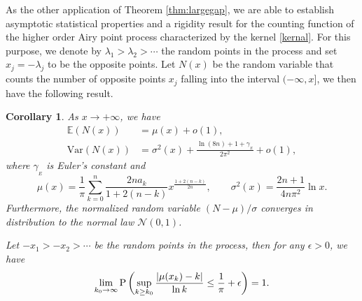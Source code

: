 \documentclass[11pt,a4paper]{article}
\newtheorem{corollary}[thm]{Corollary}
\numberwithin{equation}{section}
\def\sup {\mathop{\rm sup}\nolimits}
\begin{document}
As the other application of Theorem \ref{thm:largegap}, we are able to establish asymptotic statistical properties and a rigidity result for the counting function of the higher order Airy point process characterized by
the kernel \eqref{kernal}. For this purpose, we denote by $\lambda_1>\lambda_2>\cdots$ the random points in the process and set $x_j=-\lambda_j$ to be the opposite points. Let $N(x)$ be the random variable that counts the number of opposite points $x_j$ falling  into the interval $(-\infty,x]$, we then have the following result.
\begin{corollary}\label{thm3}
As $x\to+\infty$, we have
\begin{align}\label{expection}
\mathbb{E}(N(x))&=\mu(x)+o(1),\\
\mathrm{Var}(N(x))&=\sigma^2(x)+\frac{\ln(8n)+1+\gamma_{_E}}{2\pi^2}
+o(1),\label{variation}
\end{align}
where $\gamma_{_E}$ is Euler's constant and
\begin{equation}\label{eq:sigma}
\mu(x)=\frac{1}{\pi}\sum_{k=0}^{n}\frac{2na_k}{1+2(n-k)}x^{\frac{1+2(n-k)}{2n}},\qquad \sigma^2(x)=\frac{2n+1}{4n\pi^2}\ln{x}.
\end{equation}
Furthermore, the normalized random variable $(N-\mu)/\sigma$ converges in distribution to the normal law $\mathcal{N}(0,1)$.

Let $-x_1>-x_2>\cdots$ be the random points in the process, then for any $\epsilon>0$, we have
\begin{equation}\label{eq:upperB}
\lim_{k_0\to\infty}\mathrm{P} \left(\sup\limits_{k\geq k_0}\frac{|\mu(x_k)-k|}{ \ln k} \leq  \frac{1}{\pi}+\epsilon\right)=1.\end{equation}
\end{corollary}
\end{document}
